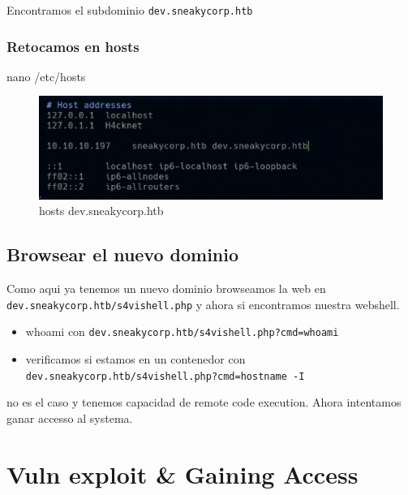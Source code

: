 \documentclass{assets/ipesethesis}
\newenvironment{Shaded}{\begin{snugshade}}{\end{snugshade}}
\newcommand{\FunctionTok}[1]{\textcolor[rgb]{0.00,0.00,0.00}{#1}}
\newcommand{\NormalTok}[1]{#1}
\providecommand{\tightlist}{%
  \setlength{\itemsep}{0pt}\setlength{\parskip}{0pt}}
\begin{document}
Encontramos el subdominio \texttt{dev.sneakycorp.htb}

\hypertarget{retocamos-en-hosts}{%
\subsubsection*{Retocamos en hosts}\label{retocamos-en-hosts}}

\begin{Shaded}
\begin{Highlighting}[]
\FunctionTok{nano}\NormalTok{ /etc/hosts}
\end{Highlighting}
\end{Shaded}

\begin{figure}
\includegraphics[width=0.9\linewidth]{images/hosts-dev-sneakycorp} \caption{hosts dev.sneakycorp.htb}\label{fig:unnamed-chunk-10}
\end{figure}

\hypertarget{browsear-el-nuevo-dominio}{%
\subsection*{Browsear el nuevo dominio}\label{browsear-el-nuevo-dominio}}

Como aqui ya tenemos un nuevo dominio browseamos la web en \texttt{dev.sneakycorp.htb/s4vishell.php} y ahora si encontramos nuestra webshell.

\begin{itemize}
\tightlist
\item
  whoami con \texttt{dev.sneakycorp.htb/s4vishell.php?cmd=whoami}
\item
  verificamos si estamos en un contenedor con \texttt{dev.sneakycorp.htb/s4vishell.php?cmd=hostname\ -I}
\end{itemize}

no es el caso y tenemos capacidad de remote code execution. Ahora intentamos ganar accesso al systema.

\hypertarget{vuln-exploit-gaining-access-4}{%
\section*{Vuln exploit \& Gaining Access}\label{vuln-exploit-gaining-access-4}}
\end{document}
